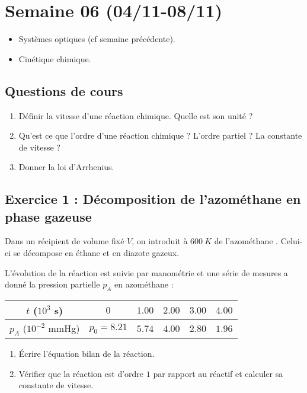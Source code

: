 \section{Semaine 06 (04/11-08/11) }


\begin{itemize}
	\item Systèmes optiques (cf semaine précédente).
	\item Cinétique chimique.
\end{itemize}

\subsection{Questions de cours}

\begin{enumerate}
	\item Définir la vitesse d'une réaction chimique. Quelle est son unité ?
	\item Qu'est ce que l'ordre d'une réaction chimique ? L'ordre partiel ? La constante de vitesse ?
	\item Donner la loi d'Arrhenius.
\end{enumerate}

\subsection{Exercice 1 : Décomposition de l'azométhane en phase gazeuse}

Dans un récipient de volume fixé $V$, on introduit à $\SI{600}{K}$ de l'azométhane . Celui-ci se décompose en éthane et en diazote gazeux. 

L'évolution de la réaction est suivie par manométrie et une série de mesures a donné la pression partielle $p_A$ en azométhane : 

\begin{tabular}{|c|c|c|c|c|c|}
	\hline 
	$t$ ($10^3$ s) & $0$ & $1.00$ & $2.00$ & $3.00$ & $4.00$ \\ \hline
	$p_A$ ($10^{-2}$ mmHg) & $p_0 = 8.21$ & $5.74$ & $4.00$ & $2.80$ & $1.96$ \\ \hline
\end{tabular}

\begin{enumerate}
	\item Écrire l'équation bilan de la réaction.
	\item Vérifier que la réaction est d'ordre $1$ par rapport au réactif et calculer sa constante de vitesse.
\end{enumerate}

